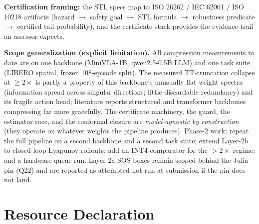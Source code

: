 \documentclass[conference,10pt]{IEEEtran}
\begin{document}
\textbf{Certification framing:} the STL specs map to ISO 26262 / IEC 62061 /
ISO 10218 artifacts (hazard $\rightarrow$ safety goal $\rightarrow$ STL formula
$\rightarrow$ robustness predicate $\rightarrow$ certified tail probability),
and the certificate stack provides the evidence trail an assessor expects.

\textbf{Scope generalization (explicit limitation).} All compression
measurements to date are on one backbone (MiniVLA-1B, qwen2.5-0.5B LLM) and
one task suite (LIBERO spatial, frozen 108-episode split). The measured
TT-truncation collapse at $\ge 2\times$ is partly a property of this
backbone's unusually flat weight spectra (information spread across singular
directions; little discardable redundancy) and its fragile action head;
literature reports structured and transformer backbones compressing far more
gracefully. The certificate machinery, the guard, the estimator race, and the
conformal closure are \emph{model-agnostic by construction} (they operate on
whatever weights the pipeline produces). Phase-2 work: repeat the full
pipeline on a second backbone and a second task suite; extend Layer-2b to
closed-loop Lyapunov rollouts; add an INT4 comparator for the $>2\times$
regime; and a hardware-queue run. Layer-2a SOS boxes remain scoped behind
the Julia pin (Q22) and are reported as attempted-not-run at submission if
the pin does not land.

\section{Resource Declaration}
\end{document}
